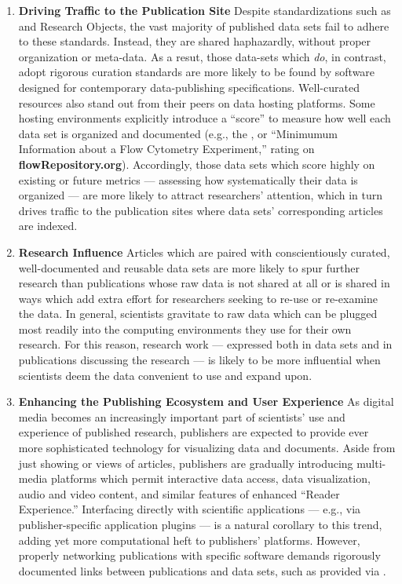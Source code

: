 \documentclass[12pt,letterpaper]{article}
\newcommand{\DCC}{\resizebox{!}{8pt}{\AcronymText{DCC}}}
\newcommand{\ATexttclr}[1]{\textcolor{tcolor}{\textbf{#1}}}
\newcommand{\MIFlowCyt}{\resizebox{!}{8pt}{\AcronymText{MIFlowCyt}}}
\newcommand{\ThreeD}{\resizebox{!}{8pt}{\AcronymText{3D}}}
\newcommand{\textscc}[1]{{\color{orr!35!black}{{%
{\textsc{\textbf{#1}}}}}}}
\newcommand{\AcronymText}[1]{{\textscc{#1}}}
\newcommand{\SDRF}{\resizebox{!}{8pt}{\ATexttclr{S}}\resizebox{!}{8pt}{\ATexttclr{DR%
\hspace{1pt}{\raisebox{-1pt}{\fontfamily{qhv}\fontseries{b}\selectfont{}\Large{F}}%
}}}}
\newcommand{\HTML}{\resizebox{!}{8pt}{\AcronymText{HTML}}}
\newcommand{\PDF}{\resizebox{!}{8pt}{\AcronymText{PDF}}}
\newcommand{\q}[1]{{\fontfamily{qcr}\selectfont ``}#1{\fontfamily{qcr}\selectfont ''}}
\begin{document}
{{\begin{enumerate}[itemsep=3pt, leftmargin=20pt]
\item{}  \textbf{Driving Traffic to the Publication Site}
\hspace{12pt} Despite standardizations 
such as \DCC{} and Research Objects, the vast majority of 
published data sets fail to adhere to these standards.  Instead, they 
are shared haphazardly, without 
proper organization or meta-data.  As a resut, those 
data-sets which \textit{do}, in contrast, adopt rigorous curation 
standards are more likely to be found by software 
designed for contemporary data-publishing specifications.  
Well-curated resources also stand out from their 
peers on data hosting platforms.  Some hosting environments 
explicitly introduce a \q{score} to measure how well 
each data set is organized and documented (e.g., 
the \MIFlowCyt{}, or \q{Minimumum Information about a 
Flow Cytometry Experiment,} rating on \textbf{flowRepository.org}).  
Accordingly, those data sets which score highly on existing or 
future metrics --- 
assessing how systematically their data is organized --- 
are more likely to attract researchers' attention, which 
in turn drives traffic to the publication sites where 
data sets' corresponding articles are indexed. 
   
\item{}  \textbf{Research Influence}  \hspace{12pt}  Articles 
which are paired with conscientiously curated, well-documented 
and reusable data sets are more likely to 
spur further research than publications whose raw 
data is not shared at all or is shared in ways which 
add extra effort for researchers seeking to re-use 
or re-examine the data.  In general, scientists 
gravitate to raw data which can be plugged 
most readily into the computing environments they 
use for their own research.  For this reason, 
research work --- expressed both in data sets and 
in publications discussing the research --- is 
likely to be more influential when scientists 
deem the data convenient to use and expand upon.  

\item{}  \textbf{Enhancing the Publishing Ecosystem and User Experience}  
\hspace{12pt} As digital media becomes an increasingly important part 
of scientists' use and experience of published research, 
publishers are expected to provide ever more sophisticated 
technology for visualizing data and documents.  
Aside from just showing \PDF{} or \HTML{} views of 
articles, publishers are gradually introducing 
multi-media platforms which permit interactive 
data access, \ThreeD{} data visualization, 
audio and video content, and similar features of 
enhanced \q{Reader Experience.}  Interfacing 
directly with scientific applications --- e.g., 
via publisher-specific application plugins --- 
is a natural corollary to this trend, adding yet 
more computational heft to publishers' platforms.  
However, properly networking publications with 
specific software demands rigorously documented 
links between publications and data sets, such as 
provided via \SDRF{}.   
\end{enumerate}
}

}
\end{document}
